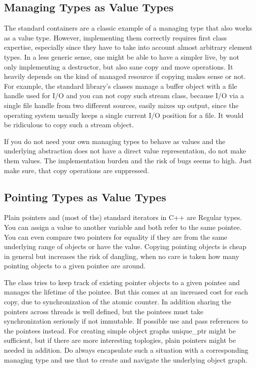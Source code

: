 \documentclass[ebook,11pt,article]{memoir}
\begin{document}
\subsection{Managing Types as Value Types}
The standard containers are a classic example of a managing type that also works as a value type. However, implementing them correctly requires first class expertise, especially since they have to take into account almost arbitrary element types. In a less generic sense, one might be able to have a simpler live, by not only implementing a destructor, but also sane copy and move operations. It heavily depends on the kind of managed resource if copying makes sense or not. For example, the standard library's  classes  manage a buffer object with a file handle used for I/O and you can not copy such stream class, because I/O via a single file handle from two different sources, easily mixes up output, since the operating system usually keeps a single current I/O position for a file. It would be ridiculous to copy such a stream object.

If you do not need your own managing types to behave as values and the underlying abstraction does not have a direct value representation, do not make them values. The implementation burden and the risk of bugs seems to high. Just make sure, that copy operations are suppressed.

\subsection{Pointing Types as Value Types}
Plain pointers and (most of the) standard iterators in C++ are Regular types. You can assign a value to another variable and both refer to the same pointee. You can even compare two pointers for equality if they are from the same underlying range of objects or have the  value. Copying pointing objects is cheap in general but increases the risk of dangling, when no care is taken how many pointing objects to a given pointee are around. 

The class  tries to keep track of existing pointer objects to a given pointee and manages the lifetime of the pointee. But this comes at an increased cost for each copy, due to synchronization of the atomic counter. In addition sharing the pointers across threads is well defined, but the pointees must take synchronization seriously if not immutable. If possible use  and pass references to the pointees instead. For creating simple object graphs unique_ptr might be sufficient, but if there are more interesting toplogies, plain pointers might be needed in addition. Do always encapsulate such a situation with a corresponding managing type and use that to create and navigate the underlying object graph.
\end{document}
